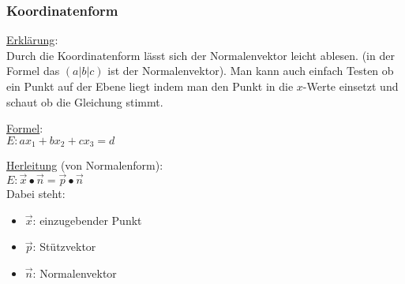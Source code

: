 
\subsubsection{Koordinatenform}
\underline{Erklärung}: \\
Durch die Koordinatenform lässt sich der Normalenvektor leicht ablesen. 
(in der Formel das $(a|b|c)$ ist der Normalenvektor).
Man kann auch einfach Testen ob ein Punkt auf der Ebene liegt indem man den Punkt in die $x$-Werte einsetzt und schaut ob die Gleichung stimmt.
\par
\underline{Formel}: \\
$
E: ax_1 + bx_2 + cx_3 = d
$
\par
\underline{Herleitung} (von Normalenform): \\
$
E: \vec{x} \bullet \vec{n} = \vec{p} \bullet \vec{n}
$
\\
Dabei steht: 
\begin{itemize}
    \item $\vec{x}$: einzugebender Punkt
    \item $\vec{p}$: Stützvektor
    \item $\vec{n}$: Normalenvektor
\end{itemize}
